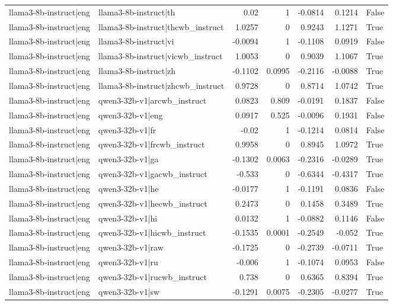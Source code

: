 \begin{table}
\begin{tabular}{l l r r r r l}
llama3-8b-instruct|eng & llama3-8b-instruct|th & 0.02 & 1 & -0.0814 & 0.1214 & False \\
llama3-8b-instruct|eng & llama3-8b-instruct|thcwb_instruct & 1.0257 & 0 & 0.9243 & 1.1271 & True \\
llama3-8b-instruct|eng & llama3-8b-instruct|vi & -0.0094 & 1 & -0.1108 & 0.0919 & False \\
llama3-8b-instruct|eng & llama3-8b-instruct|vicwb_instruct & 1.0053 & 0 & 0.9039 & 1.1067 & True \\
llama3-8b-instruct|eng & llama3-8b-instruct|zh & -0.1102 & 0.0995 & -0.2116 & -0.0088 & True \\
llama3-8b-instruct|eng & llama3-8b-instruct|zhcwb_instruct & 0.9728 & 0 & 0.8714 & 1.0742 & True \\
llama3-8b-instruct|eng & qwen3-32b-v1|arcwb_instruct & 0.0823 & 0.809 & -0.0191 & 0.1837 & False \\
llama3-8b-instruct|eng & qwen3-32b-v1|eng & 0.0917 & 0.525 & -0.0096 & 0.1931 & False \\
llama3-8b-instruct|eng & qwen3-32b-v1|fr & -0.02 & 1 & -0.1214 & 0.0814 & False \\
llama3-8b-instruct|eng & qwen3-32b-v1|frcwb_instruct & 0.9958 & 0 & 0.8945 & 1.0972 & True \\
llama3-8b-instruct|eng & qwen3-32b-v1|ga & -0.1302 & 0.0063 & -0.2316 & -0.0289 & True \\
llama3-8b-instruct|eng & qwen3-32b-v1|gacwb_instruct & -0.533 & 0 & -0.6344 & -0.4317 & True \\
llama3-8b-instruct|eng & qwen3-32b-v1|he & -0.0177 & 1 & -0.1191 & 0.0836 & False \\
llama3-8b-instruct|eng & qwen3-32b-v1|hecwb_instruct & 0.2473 & 0 & 0.1458 & 0.3489 & True \\
llama3-8b-instruct|eng & qwen3-32b-v1|hi & 0.0132 & 1 & -0.0882 & 0.1146 & False \\
llama3-8b-instruct|eng & qwen3-32b-v1|hicwb_instruct & -0.1535 & 0.0001 & -0.2549 & -0.052 & True \\
llama3-8b-instruct|eng & qwen3-32b-v1|raw & -0.1725 & 0 & -0.2739 & -0.0711 & True \\
llama3-8b-instruct|eng & qwen3-32b-v1|ru & -0.006 & 1 & -0.1074 & 0.0953 & False \\
llama3-8b-instruct|eng & qwen3-32b-v1|rucwb_instruct & 0.738 & 0 & 0.6365 & 0.8394 & True \\
llama3-8b-instruct|eng & qwen3-32b-v1|sw & -0.1291 & 0.0075 & -0.2305 & -0.0277 & True \\

\end{tabular}
\end{table}
